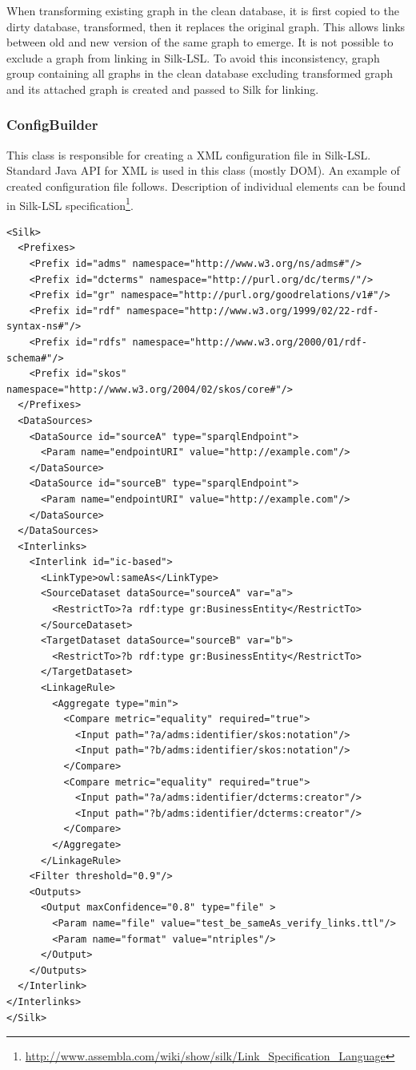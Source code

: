 When transforming existing graph in the clean database, it is first copied to the dirty database, transformed, then it replaces the original graph. This allows links between old and new version of the same graph to emerge. It is not possible to exclude a graph from linking in Silk-LSL. To avoid this inconsistency, graph group containing all graphs in the clean database excluding transformed graph and its attached graph is created and passed to Silk for linking.

\subsubsection{ConfigBuilder}

This class is responsible for creating a XML configuration file in Silk-LSL. Standard Java API for XML is used in this class (mostly DOM). An example of created configuration file follows. Description of individual elements can be found in Silk-LSL specification\footnote{\url{http://www.assembla.com/wiki/show/silk/Link\_Specification\_Language}}.

\begin{lstlisting}[caption=Configuration file in Silk-LSL,label=lst:silk-LSL]
<Silk>
  <Prefixes>
    <Prefix id="adms" namespace="http://www.w3.org/ns/adms#"/>
    <Prefix id="dcterms" namespace="http://purl.org/dc/terms/"/>
    <Prefix id="gr" namespace="http://purl.org/goodrelations/v1#"/>
    <Prefix id="rdf" namespace="http://www.w3.org/1999/02/22-rdf-syntax-ns#"/>
    <Prefix id="rdfs" namespace="http://www.w3.org/2000/01/rdf-schema#"/>
    <Prefix id="skos" namespace="http://www.w3.org/2004/02/skos/core#"/>
  </Prefixes>
  <DataSources>
    <DataSource id="sourceA" type="sparqlEndpoint">
      <Param name="endpointURI" value="http://example.com"/>
    </DataSource>
    <DataSource id="sourceB" type="sparqlEndpoint">
      <Param name="endpointURI" value="http://example.com"/>
    </DataSource>
  </DataSources>
  <Interlinks>
    <Interlink id="ic-based">
      <LinkType>owl:sameAs</LinkType>
      <SourceDataset dataSource="sourceA" var="a">
        <RestrictTo>?a rdf:type gr:BusinessEntity</RestrictTo>
      </SourceDataset>
      <TargetDataset dataSource="sourceB" var="b">
        <RestrictTo>?b rdf:type gr:BusinessEntity</RestrictTo>
      </TargetDataset>
      <LinkageRule>
        <Aggregate type="min">
          <Compare metric="equality" required="true">
            <Input path="?a/adms:identifier/skos:notation"/>
            <Input path="?b/adms:identifier/skos:notation"/>
          </Compare>
          <Compare metric="equality" required="true">
            <Input path="?a/adms:identifier/dcterms:creator"/>
            <Input path="?b/adms:identifier/dcterms:creator"/>
          </Compare>  
        </Aggregate>   	
      </LinkageRule>
    <Filter threshold="0.9"/>
    <Outputs>
      <Output maxConfidence="0.8" type="file" >
        <Param name="file" value="test_be_sameAs_verify_links.ttl"/>
        <Param name="format" value="ntriples"/>
      </Output>
    </Outputs>
  </Interlink>
</Interlinks>
</Silk>
\end{lstlisting}

